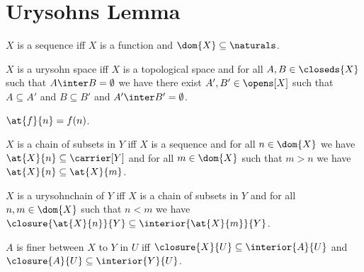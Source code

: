 















\section{Urysohns Lemma}




\begin{definition}\label{sequence}
    $X$ is a sequence iff $X$ is a function and $\dom{X} \subseteq \naturals$.
\end{definition}


\begin{abbreviation}\label{urysohnspace}
    $X$ is a urysohn space iff
    $X$ is a topological space and
    for all $A,B \in \closeds{X}$ such that $A \inter B = \emptyset$
    we have there exist $A',B' \in \opens[X]$
    such that  $A \subseteq A'$ and $B \subseteq B'$ and $A' \inter B' = \emptyset$.    
\end{abbreviation}


\begin{abbreviation}\label{at}
    $\at{f}{n} = f(n)$.
\end{abbreviation}


\begin{definition}\label{chain_of_subsets}
    $X$ is a chain of subsets in $Y$ iff $X$ is a sequence and for all $n \in \dom{X}$ we have $\at{X}{n} \subseteq \carrier[Y]$ and for all $m \in \dom{X}$ such that $m > n$ we have $\at{X}{n} \subseteq \at{X}{m}$. 
\end{definition}


\begin{definition}\label{urysohnchain}%
    $X$ is a urysohnchain of $Y$ iff $X$ is a chain of subsets in $Y$ and for all $n,m \in \dom{X}$ such that $n < m$ we have $\closure{\at{X}{n}}{Y} \subseteq \interior{\at{X}{m}}{Y}$.
\end{definition}

\begin{definition}\label{urysohn_finer_set}
    $A$ is finer between $X$ to $Y$ in $U$ iff $\closure{X}{U} \subseteq \interior{A}{U}$ and $\closure{A}{U} \subseteq \interior{Y}{U}$.
\end{definition}

